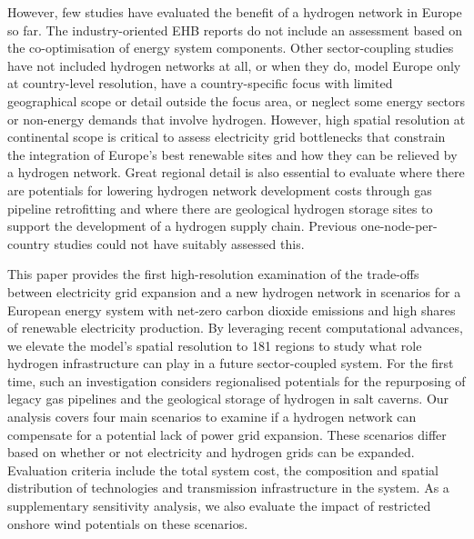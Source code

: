 However, few studies have evaluated the benefit of a hydrogen network in Europe
so far. The industry-oriented EHB reports do not include an assessment based on
the co-optimisation of energy system components.
\cite{gasforclimateEuropeanHydrogen2020,gasforclimateEuropeanHydrogen2021,gasforclimateExtendingEuropean2021,gasforclimateEuropeanHydrogen2022}
Other sector-coupling studies have not included hydrogen networks at all,
\cite{brownSynergiesSector2018,pickeringDiversityOptions2022,childFlexibleElectricity2019,kendziorskiCentralizedDecentral2022}
or when they do, model Europe only at country-level resolution,
\cite{europeancommission.directorategeneralforenergy.METISStudy2021,victoriaSpeedTechnological2022}
have a country-specific focus with limited geographical scope or detail outside
the focus area, \cite{gilsInteractionHydrogen2021} or neglect some energy
sectors or non-energy demands that involve hydrogen.
\cite{gilsInteractionHydrogen2021,Caglayan2019,caglayanRobustDesign2021}
However, high spatial resolution at continental scope is critical to assess
electricity grid bottlenecks that constrain the integration of Europe's best
renewable sites and how they can be relieved by a hydrogen network. Great
regional detail is also essential to evaluate where there are potentials for
lowering hydrogen network development costs through gas pipeline retrofitting
and where there are geological hydrogen storage sites to support the development
of a hydrogen supply chain. Previous one-node-per-country studies could not have
suitably assessed this.

This paper provides the first high-resolution examination of the trade-offs
between electricity grid expansion and a new hydrogen network in scenarios for a
European energy system with net-zero carbon dioxide emissions and high shares of
renewable electricity production. By leveraging recent computational advances,
we elevate the model's spatial resolution to 181 regions to study what role
hydrogen infrastructure can play in a future sector-coupled system. For the
first time, such an investigation considers regionalised potentials for the
repurposing of legacy gas pipelines and the geological storage of hydrogen in
salt caverns. Our analysis covers four main scenarios to examine if a hydrogen
network can compensate for a potential lack of power grid expansion. These
scenarios differ based on whether or not electricity and hydrogen grids can be
expanded. Evaluation criteria include the total system cost, the composition and
spatial distribution of technologies and transmission infrastructure in the
system. As a supplementary sensitivity analysis, we also evaluate the impact of
restricted onshore wind potentials on these scenarios.

